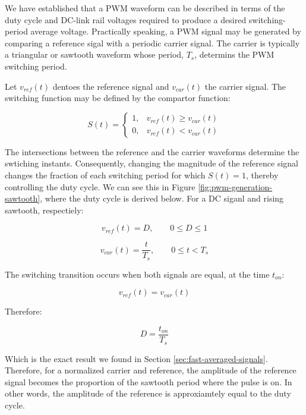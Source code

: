 \documentclass{article}
\begin{document}
We have established that a PWM waveform can be described in terms of the duty cycle and DC-link rail voltages required to produce a desired switching-period average voltage. Practically speaking, a PWM signal may be generated by comparing a reference sigal with a periodic carrier signal. The carrier is typically a triangular or sawtooth waveform whose period, $T_s$, determins the PWM switching period. 

Let $v_{ref}(t)$ dentoes the reference signal and $v_{car}(t)$ the carrier signal. The switching function may be defined by the compartor function:

\begin{equation}
    S(t) =
    \begin{cases}
        1, & v_{ref}(t) \geq v_{car}(t) \\
        0, & v_{ref}(t) < v_{car}(t)
    \end{cases}    
\end{equation}

The intersections between the reference and the carrier waveforms determine the swtiching instants. Consequently, changing the magnitude of the reference signal changes the fraction of each switching period for which $S(t) = 1$, thereby controlling the duty cycle. We can see this in Figure \ref{fig:pwm-generation-sawtooth}, where the duty cycle is derived below. For a DC siganl and rising sawtooth, respectiely:

\begin{equation}
    v_{ref}(t) = D, \qquad
    0 \leq D \leq 1
\end{equation}

\begin{equation}
    v_{car}(t) = \frac{t}{T_s}, \qquad
    0 \leq t < T_s
\end{equation}

The switching transition occurs when both signals are equal, at the time $t_{on}$:

\begin{equation}
    v_{ref}(t) = v_{car}(t)
\end{equation}

Therefore:

\begin{equation}
\label{eqn:duty-cycle}
    D = \frac{t_{on}}{T_s}
\end{equation}

Which is the exact result we found in Section \ref{sec:fast-averaged-signals}. Therefore, for a normalized carrier and reference, the amplitude of the reference signal becomes the proportion of the sawtooth period where the pulse is on. In other words, the amplitude of the reference is approxiamtely equal to the duty cycle.
\end{document}
